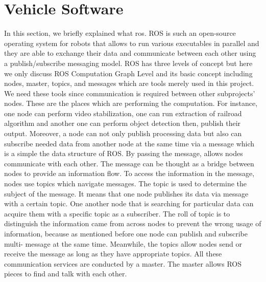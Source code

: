 \section{Vehicle Software}
In this section, we briefly explained what \acrshort{ros}. ROS is such an open-source operating system for robots that allows to run various executables in parallel and they are able to exchange their data and communicate between each other using a publish/subscribe messaging model.
ROS has three levels of concept but here we only discuss ROS Computation Graph Level and its basic concept including nodes, master, topics, and messages which are tools merely used in this project. We need these tools since communication is required between other subprojects’ nodes. These are the places which are performing the computation. For instance, one node can perform video stabilization, one can run extraction of railroad algorithm and another one can perform object detection then, publish their output. Moreover, a node can not only publish processing data but also can subscribe needed data from another node at the same time via a message which is a simple the data structure of ROS. By passing the message, allows nodes communicate with each other. The message can be thought as a bridge between nodes to provide an information flow. To access the information in the message, nodes use topics which navigate messages. The topic is used to determine the subject of the message. It means that one node publishes its data via message with a certain topic. One another node that is searching for particular data can acquire them with a specific topic as a subscriber. The roll of topic is to distinguish the information came from across nodes to prevent the wrong usage of information, because as mentioned before one node can publish and subscribe multi- message at the same time. Meanwhile, the topics allow nodes send or receive the message as long as they have appropriate topics. All these communication services are conducted by a master. The master allows ROS pieces to find and talk with each other.
